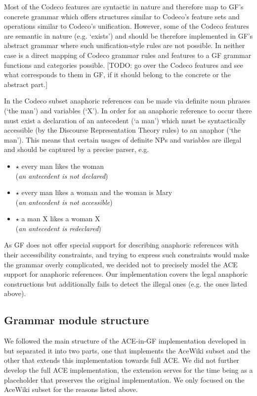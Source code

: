 \documentclass[a4paper]{article}
\begin{document}
Most of the Codeco features are syntactic in nature and therefore map to
GF's concrete grammar which offers structures similar to Codeco's feature
sets and operations similar to Codeco's unification. However, some of the
Codeco features are semantic in nature (e.g. `exists') and should be therefore
implemented in GF's abstract grammar where such unification-style rules are
not possible. In neither case is a direct mapping of Codeco grammar rules
and features to a GF grammar functions and categories possible.
[TODO: go over the Codeco features and see what corresponds to them
in GF, if it should belong to the concrete or the abstract part.]

In the Codeco subset anaphoric references can be made via definite noun
phrases (`the man') and variables (`X'). In order for an anaphoric reference
to occur there must exist a declaration of an antecedent (`a man') which must
be syntactically accessible (by the Discourse Representation Theory rules)
to an anaphor (`the man'). This means that certain usages of definite NPs
and variables are illegal and should be captured by a precise parser, e.g.

\begin{itemize}
\item $\star$ every man likes the woman \hfill \\
(\emph{an antecedent is not declared})
\item $\star$ every man likes a woman and the woman is Mary \hfill \\
(\emph{an antecedent is not accessible})
\item $\star$ a man X likes a woman X \hfill \\
(\emph{an antecedent is redeclared})
\end{itemize}

As GF does not offer special support for describing anaphoric references
with their accessibility constraints, and trying to express such constraints
would make the grammar overly complicated,
we decided not to precisely model the ACE support for anaphoric references.
Our implementation covers the legal anaphoric constructions but additionally
fails to detect the illegal ones (e.g. the ones listed above).

\subsection{Grammar module structure}

We followed the main structure of the ACE-in-GF implementation developed
in \cite{ranta:cnl2009_revised} but separated it into two parts, one that
implements the AceWiki subset and the other that extends this implementation
towards full ACE. We did not further develop the full ACE implementation, the
extension serves for the time being as a placeholder that preserves the
original \cite{ranta:cnl2009_revised} implementation. We only focused on the
AceWiki subset for the reasons listed above.
\end{document}
